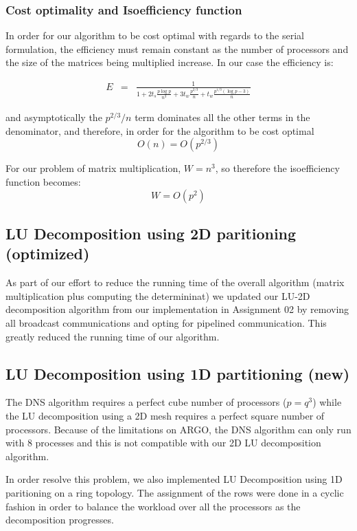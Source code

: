 \documentclass{article}
\begin{document}
\subsubsection{Cost optimality and Isoefficiency function}

In order for our algorithm to be cost optimal with regards to the serial formulation, the efficiency must remain constant as the
number of processors and the size of the matrices being multiplied increase.  In our case the efficiency is:

\begin{eqnarray*}
E &=& \frac{1}{   1 + 2 t_s \frac{ p \log{p} }{ n^3 } + 3 t_w \frac{p^{2/3}}{n} + t_w \frac{p^{1/3} (\log{p} - 3)}{n} }
\end{eqnarray*}

and asymptotically the $p^{2/3}/n$ term dominates all the other terms in the denominator, and therefore, in order for the algorithm to be cost 
optimal $$O(n) = O(p^{2/3})$$

For our problem of matrix multiplication, $W = n^3$, so therefore the isoefficiency function becomes:
$$W = O(p^2)$$

\subsection{LU Decomposition using 2D paritioning (optimized)}

As part of our effort to reduce the running time of the overall algorithm
(matrix multiplication plus computing the determininat) we updated our LU-2D
decomposition algorithm from our implementation in Assignment 02 by removing all
broadcast communications and opting for pipelined communication.  This greatly
reduced the running time of our algorithm.

\subsection{LU Decomposition using 1D partitioning (new)}


The DNS algorithm requires a perfect cube number of processors ($p = q^3$) while
the LU decomposition using a 2D mesh requires a perfect square number of
processors.  Because of the limitations on ARGO, the DNS algorithm can only run
with 8 processes and this is not compatible with our 2D LU decomposition
algorithm.

In order resolve this problem, we also implemented LU Decomposition using 1D
paritioning on a ring topology.  The assignment of the rows were done in a
cyclic fashion in order to balance the workload over all the processors as the
decomposition progresses.
\end{document}

